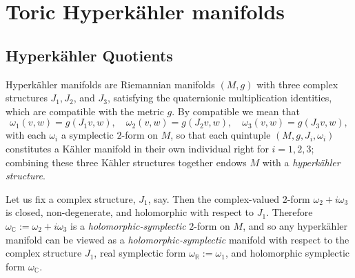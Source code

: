 \documentclass{amsart}
\newcommand{\w}{\omega}
\newcommand{\RR}{\mathbb{R}}
\newcommand{\CC}{\mathbb{C}}
\begin{document}
    
    
	\section{Toric Hyperk\"ahler manifolds}
	
	\subsection{Hyperk\"ahler Quotients}
	
	Hyperk\"ahler manifolds are Riemannian manifolds $(M,g)$ with three complex structures $J_{1}, J_{2}$, and $J_{3}$, satisfying the quaternionic multiplication identities, which are compatible with the metric $g$. By compatible we mean that
	\[
		\w_{1}(v,w) = g(J_{1}v,w),\quad \w_{2}(v,w) = g(J_{2}v,w),\quad \w_{3}(v,w) = g(J_{3}v,w),
	\]
	with each $\w_{i}$ a symplectic $2$-form on $M$, so that each quintuple $(M, g, J_{i}, \w_{i})$ constitutes a K\"ahler manifold in their own individual right for $i = 1, 2, 3$; combining these three K\"ahler structures together endows $M$ with a \emph{hyperk\"ahler structure}.
		
	Let us fix a complex structure, $J_{1}$, say. Then the complex-valued $2$-form $\w_{2} + i\w_{3}$ is closed, non-degenerate, and holomorphic with respect to $J_{1}$. Therefore $\w_{\CC} := \w_{2} + i\w_{3}$ is a \emph{holomorphic-symplectic} $2$-form on $M$, and so any hyperk\"ahler manifold can be viewed as a \emph{holomorphic-symplectic} manifold with respect to the complex structure $J_{1}$, real symplectic form $\w_{\RR} := \w_{1}$, and holomorphic symplectic form $\w_{\CC}$.
	
\end{document}
